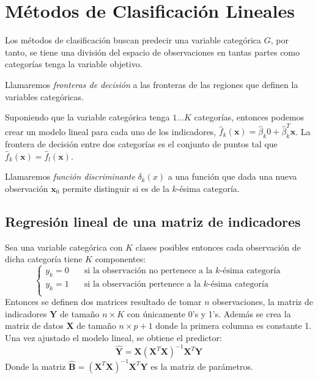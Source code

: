\newpage
\section{Métodos de Clasificación Lineales}
\noindent Los métodos de clasificación buscan predecir una variable categórica $G$, por tanto, se tiene una división del espacio de observaciones en tantas partes como categorías tenga la variable objetivo. 
\begin{defi}
Llamaremos \textit{fronteras de decisión} a las fronteras de las regiones que definen la variables categóricas. 
\end{defi}
\noindent Suponiendo que la variable categórica tenga $1\ldots K$ categorías, entonces podemos crear un modelo lineal para cada uno de los indicadores, $\hat{f}_k(\textbf{x})=\hat{\beta}_k0+\hat{\beta}_k^T\textbf{x}$. 
La frontera de decisión entre dos categorías es el conjunto de puntos tal que $\hat{f}_k(\textbf{x})=\hat{f}_l(\textbf{x})$.
\begin{defi}
Llamaremos \textit{función discriminante} $\delta_k(x)$ a una función que dada una nueva observación $\textbf{x}_0$ permite distinguir si es de la $k$-ésima categoría. 
\end{defi}
\subsection{Regresión lineal de una matriz de indicadores}
\noindent Sea una variable categórica con $K$ clases posibles entonces cada observación de dicha categoría tiene $K$ componentes:
\begin{equation}
\begin{cases}
y_k=0 \quad &\text{si la observación no pertenece a la } k \text{-ésima categoría}\\
y_k=1 \quad &\text{si la observación pertenece a la } k \text{-ésima categoría}\\
\end{cases}
\end{equation}
Entonces se definen dos matrices resultado de tomar $n$ observaciones, la matriz de indicadores $\textbf{Y}$ de tamaño $n\times K$ con únicamente 0's y 1's. Además se crea la matriz de datos $\textbf{X}$ de tamaño $n\times p+1$ donde la primera columna es constante 1. Una vez ajustado el modelo lineal, se obtiene el predictor:
\begin{equation}
\hat{\textbf{Y}}=\textbf{X}(\textbf{X}^T \textbf{X} )^{-1}\textbf{X}^T \textbf{Y}  
\end{equation} 
Donde la matriz $\hat{\textbf{B}}=(\textbf{X}^T \textbf{X} )^{-1}\textbf{X}^T \textbf{Y}$ es la matriz de parámetros.


